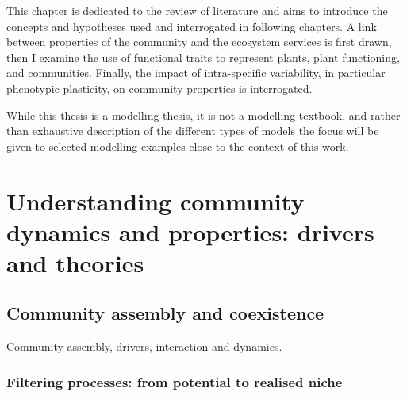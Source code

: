 \begin{fullwidth}
This chapter is dedicated to the review of literature and aims to introduce the concepts and hypotheses used and interrogated in following chapters. A link between properties of the community and the ecosystem services is first drawn, then I examine the use of functional traits to represent plants, plant functioning, and communities. Finally, the impact of intra-specific variability, in particular phenotypic plasticity, on community properties is interrogated.

While this thesis is a modelling thesis, it is not a modelling textbook, and rather than exhaustive description of the different types of models the focus will be given to selected modelling examples close to the context of this work.
\end{fullwidth}

\chapter{Understanding community dynamics and properties: drivers and theories}\label{chapter:coexistence}





\section{Community assembly and coexistence}

Community assembly, drivers, interaction and dynamics.


\subsection{Filtering processes: from potential to realised niche}


